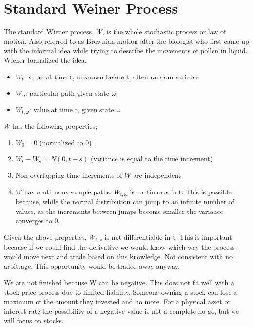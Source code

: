 
\section{Standard Weiner Process}

The standard Wiener process, $W$, is the whole stochastic process or law of
motion. Also referred to as Brownian motion after the biologist who first came
up with the informal idea while trying to describe the movements of pollen in
liquid. Wiener formalized the idea.
\begin{itemize}
    \item $W_t$: value at time t, unknown before t, often random variable
    \item $W_{\omega}$: particular path given state $\omega$
    \item $W_{t,\omega}$: value at time t, given state $\omega$
\end{itemize}
$W$ has the following properties;
\begin{enumerate}
\item $W_0=0$ (normalized to 0)
\item $W_t-W_s \sim N(0, t-s)$ (variance is equal to the time increment)
\item Non-overlapping time increments of $W$ are independent
\item $W$ has continuous sample paths, $W_{t, \omega}$ is continuous in t.
    This is possible because, while the normal distribution can jump to an
    infinite number of values, as the increments between jumps become smaller
    the variance converges to 0.
\end{enumerate}

Given the above properties, $W_{t,\omega}$ is not differentiable in t. This is
important because if we could find the derivative we would know which way the
process would move next and trade based on this knowledge. Not consistent with
no arbitrage. This opportunity would be traded away anyway.

We are not finished because W can be negative. This does not fit well with a
stock price process due to limited liability. Someone owning a stock can lose a
maximum of the amount they invested and no more. For a physical asset or
interest rate the possibility of a negative value is not a complete no go, but
we will focus on stocks.
